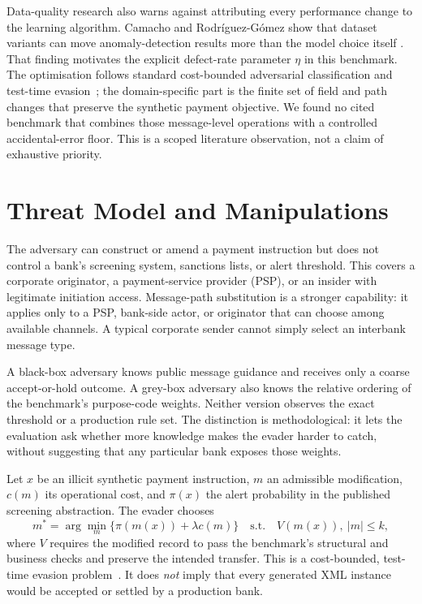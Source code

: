 \documentclass[conference]{IEEEtran}
\begin{document}
Data-quality research also warns against attributing every performance change
to the learning algorithm. Camacho and Rodr\'iguez-G\'omez show that dataset
variants can move anomaly-detection results more than the model choice itself
\cite{camacho2025}. That finding motivates the explicit defect-rate parameter
$\eta$ in this benchmark. The optimisation follows standard cost-bounded
adversarial classification and test-time evasion~\cite{bruckner2011,biggio2013};
the domain-specific part is the finite set of field and path changes that
preserve the synthetic payment objective. We found no cited benchmark that
combines those message-level operations with a controlled accidental-error
floor. This is a scoped literature observation, not a claim of exhaustive
priority.

\section{Threat Model and Manipulations}
The adversary can construct or amend a payment instruction but does not control
a bank's screening system, sanctions lists, or alert threshold. This covers a
corporate originator, a payment-service provider (PSP), or an insider with
legitimate initiation access. Message-path substitution is a stronger
capability: it applies only to a PSP, bank-side actor, or originator that can
choose among available channels. A typical corporate sender cannot simply
select an interbank message type.

A black-box adversary knows public message guidance and receives only a coarse
accept-or-hold outcome. A grey-box adversary also knows the relative ordering
of the benchmark's purpose-code weights. Neither version observes the exact
threshold or a production rule set. The distinction is methodological: it
lets the evaluation ask whether more knowledge makes the evader harder to
catch, without suggesting that any particular bank exposes those weights.

Let $x$ be an illicit synthetic payment instruction, $m$ an admissible
modification, $c(m)$ its operational cost, and $\pi(x)$ the alert probability
in the published screening abstraction. The evader chooses
\begin{equation}
 m^*=\arg\min_m\{\pi(m(x))+\lambda c(m)\}
 \quad\text{s.t.}\quad V(m(x)),\ |m|\leq k,
 \label{eq:evader}
\end{equation}
where $V$ requires the modified record to pass the benchmark's structural and
business checks and preserve the intended transfer. This is a cost-bounded,
test-time evasion problem~\cite{bruckner2011,biggio2013}. It does \emph{not}
imply that every generated XML instance would be accepted or settled by a
production bank.
\end{document}
